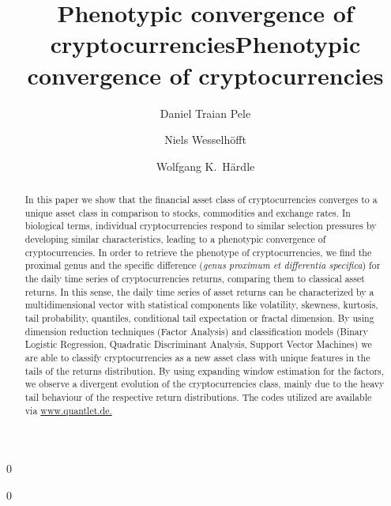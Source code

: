 \documentclass[a4paper,12pt]{elsarticle} %
\newcommand{\blind}{0} %
\begin{document}
\begin{frontmatter}

\blind{

\title{Phenotypic convergence of cryptocurrencies} %

\author[1]{Daniel Traian Pele}
\author[2]{Niels Wesselhöfft}
\author[3]{Wolfgang K.\ Härdle}
\address[1]{Department of Statistics and Econometrics, Faculty of Cybernetics, Statistics and Economic Informatics, The Bucharest University of Economic Studies, 010371 Bucharest, Romania, E-mail: danpele@ase.ro}
\address[2]{Humboldt-Universität zu Berlin, IRTG 1792, Spandauer Str. 1, 10178 Berlin, Germany, E-mail: wesselhn@hu-berlin.de}
\address[3]{Humboldt-Universität zu Berlin, IRTG 1792, Spandauer Str. 1, 10178 Berlin, Germany and School of Business, Singapore Management University, 50 Stamford Road, Singapore 178899}

}\fi

\blind
{
\title{Phenotypic convergence of cryptocurrencies}
}\fi

\date{\;}


\begin{abstract}
\footnotesize{
\noindent In this paper we show that the financial asset class of cryptocurrencies converges to a unique asset class in comparison to stocks, commodities and exchange rates. In biological terms, individual cryptocurrencies respond to similar selection pressures by developing similar characteristics, leading to a phenotypic convergence of cryptocurrencies. In order to retrieve the phenotype of cryptocurrencies, we find the proximal genus and the specific difference (\textit{genus proximum et differentia specifica}) for the daily time series of cryptocurrencies returns, comparing them to classical asset returns. In this sense, the daily time series of asset returns can be characterized by a multidimensional vector with statistical components like volatility, skewness, kurtosis, tail probability, quantiles, conditional tail expectation or fractal dimension. By using dimension reduction techniques (Factor Analysis) and classification models (Binary Logistic Regression, Quadratic Discriminant Analysis, Support Vector Machines) we are able to classify cryptocurrencies as a new asset class with unique features in the tails of the returns distribution. By using expanding window estimation for the factors, we observe a divergent evolution of the cryptocurrencies class, mainly due to the heavy tail behaviour of the respective return distributions. The codes utilized are available via \url{www.quantlet.de.} \\


}
\end{abstract}
\end{frontmatter}
\end{document}
